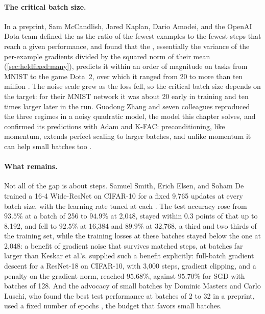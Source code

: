 \begin{refsection}
\paragraph{The critical batch size.} In a preprint, Sam McCandlish, Jared Kaplan, Dario Amodei, and the OpenAI Dota team defined the  as the ratio of the fewest examples to the fewest steps that reach a given performance, and found that the , essentially the variance of the per-example gradients divided by the squared norm of their mean (\cref{sec:heldfixed:many}), predicts it within an order of magnitude on tasks from MNIST to the game Dota~2, over which it ranged from 20 to more than ten million \parencite{McCandlishEtAl2018}. The noise scale grew as the loss fell, so the critical batch size depends on the target: for their MNIST network it was about 20 early in training and ten times larger later in the run. Guodong Zhang and seven colleagues reproduced the three regimes in a noisy quadratic model, the model this chapter solves, and confirmed its predictions with Adam and K-FAC: preconditioning, like momentum, extends perfect scaling to larger batches, and unlike momentum it can help small batches too \parencite{ZhangEtAl2019}.

\paragraph{What remains.} Not all of the gap is about steps. Samuel Smith, Erich Elsen, and Soham De trained a 16-4 Wide-ResNet on CIFAR-10 for a fixed 9,765 updates at every batch size, with the learning rate tuned at each \parencite{SmithElsenDe2020}. The test accuracy rose from $93.5\%$ at a batch of 256 to $94.9\%$ at 2,048, stayed within 0.3 points of that up to 8,192, and fell to $92.5\%$ at 16,384 and $89.9\%$ at 32,768, a third and two thirds of the training set, while the training losses at these batches stayed below the one at 2,048: a benefit of gradient noise that survives matched steps, at batches far larger than Keskar et al.'s. \Textcite{GeipingEtAl2022} supplied such a benefit explicitly: full-batch gradient descent for a ResNet-18 on CIFAR-10, with 3,000 steps, gradient clipping, and a penalty on the gradient norm, reached $95.68\%$, against $95.70\%$ for SGD with batches of 128. And the advocacy of small batches by Dominic Masters and Carlo Luschi, who found the best test performance at batches of 2 to 32 in a preprint, used a fixed number of epochs \parencite{MastersLuschi2018}, the budget that favors small batches.


\end{refsection}
